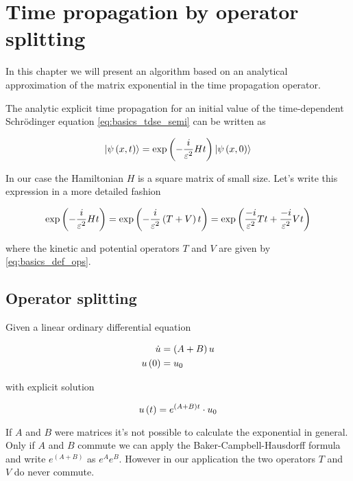 \chapter{Time propagation by operator splitting}
\label{ch_operator_splitting}

In this chapter we will present an algorithm based on an analytical approximation
of the matrix exponential in the time propagation operator.

The analytic explicit time propagation for an initial value of the time-dependent
Schrödinger equation \eqref{eq:basics_tdse_semi} can be written as

\begin{equation} \label{eq:analytic_time_propagation}
  \Ket{\psi\left( x,t \right)} = \exp\left( -\frac{i}{\varepsilon^2}H t \right) \Ket{\psi\left( x,0 \right)}
\end{equation}

In our case the Hamiltonian $H$ is a square matrix of small size. Let's write this
expression in a more detailed fashion

\begin{equation}
  \exp\left( -\frac{i}{\varepsilon^2}H t \right)
  = \exp\left( -\frac{i}{\varepsilon^2}\left(T+V\right) t \right)
  = \exp\left( \frac{-i}{\varepsilon^2}T t + \frac{-i}{\varepsilon^2}V t \right)
\end{equation}

where the kinetic and potential operators $T$ and $V$ are given by \eqref{eq:basics_def_ops}.


\section{Operator splitting}

Given a linear ordinary differential equation

\begin{equation}
\begin{split}
  \dot{u} & = \left(A + B\right) u \\
 u\left( 0 \right) & = u_0 \\
\end{split}
\end{equation}

with explicit solution

\begin{equation}
  u\left( t \right) = e^{\left(A+B\right)t} \cdot u_0
\end{equation}

If $A$ and $B$ were matrices it's not possible to calculate the exponential in general.
Only if $A$ and $B$ commute we can apply the Baker-Campbell-Hausdorff formula
and write $e^{\left(A+B\right)}$ as $e^{A}e^{B}$. However in our application the two
operators $T$ and $V$ do never commute.

